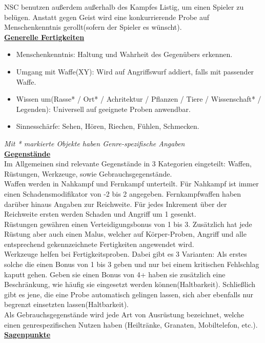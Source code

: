 \documentclass[twoside,a4paper]{minimal}
\begin{document}
\begin{multicols*}{3}
NSC benutzen außerdem außerhalb des Kampfes Listig, um einen Spieler zu belügen. Anstatt gegen Geist wird eine konkurrierende Probe auf Menschenkenntnis gerollt(sofern der Spieler es wünscht).
\textbf{\uline{\\Generelle Fertigkeiten}}
\begin{itemize}
\item Menschenkenntnis: Haltung und Wahrheit des Gegenübers erkennen.
\item Umgang mit Waffe(XY): Wird auf Angriffswurf addiert, falls mit passender Waffe.
\item Wissen um(Rasse* / Ort* / Achritektur / Pflanzen / Tiere / Wissenschaft* / Legenden): Universell auf geeignete Proben anwendbar.
\item Sinnesschärfe: Sehen, Hören, Riechen, Fühlen, Schmecken.
\end{itemize}
\textit{Mit * markierte Objekte haben Genre-spezifische Angaben}
\textbf{\uline{\\Gegenstände}}
\\Im Allgemeinen sind relevante Gegenstände in 3 Kategorien eingeteilt: Waffen, Rüstungen, Werkzeuge, sowie Gebrauchsgegenstände.
\\Waffen werden in Nahkampf und Fernkampf unterteilt. Für Nahkampf ist immer einen Schadensmodifikator von -2 bis 2 angegeben. Fernkampfwaffen haben darüber hinaus Angaben zur Reichweite. Für jedes Inkrement über der Reichweite ersten werden Schaden und Angriff um 1 gesenkt.
\\Rüstungen gewähren einen Verteidigungsbonus von 1 bis 3. Zusätzlich hat jede Rüstung aber auch einen Malus, welcher auf Körper-Proben, Angriff und alle entsprechend gekennzeichnete Fertigkeiten angewendet wird.
\\Werkzeuge helfen bei Fertigkeitsproben. Dabei gibt es 3 Varianten: Als erstes solche die einen Bonus von 1 bis 3 geben und nur bei einem kritischen Fehlschlag kaputt gehen. Geben sie einen Bonus von 4+ haben sie zusätzlich eine Beschränkung, wie häufig sie eingesetzt werden können(Haltbarkeit). Schließlich gibt es jene, die eine Probe automatisch gelingen lassen, sich aber ebenfalls nur begrenzt einsetzten lassen(Haltbarkeit).
\\Als Gebrauchsgegenstände wird jede Art von Ausrüstung bezeichnet, welche einen genrespezifischen Nutzen haben (Heiltränke, Granaten, Mobiltelefon, etc.).
\textbf{\uline{\\Sagenpunkte}}

\end{multicols*}
\end{document}
